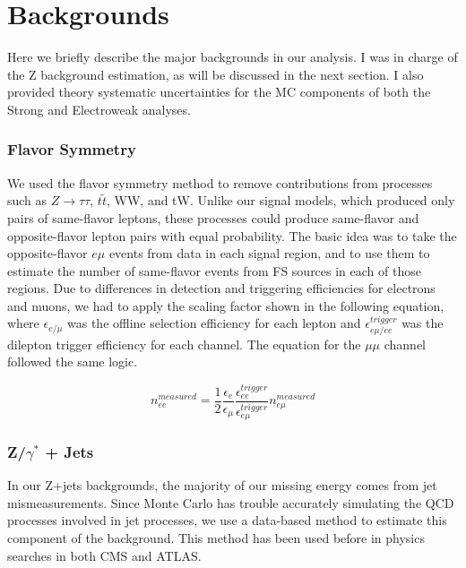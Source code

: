 \chapter{Backgrounds}

Here we briefly describe the major backgrounds in our analysis. I was in charge of the Z background estimation, as will be discussed in the next section. I also provided theory systematic uncertainties for the MC components of both the Strong and Electroweak analyses.

\subsection*{Flavor Symmetry}

We used the flavor symmetry method to remove contributions from processes such as $Z\rightarrow\tau\tau$, $t\tilde{t}$, WW, and tW. Unlike our signal models, which produced only pairs of same-flavor leptons, these processes could produce same-flavor and opposite-flavor lepton pairs with equal probability. The basic idea was to take the opposite-flavor $e\mu$ events from data in each signal region, and to use them to estimate the number of same-flavor events from FS sources in each of those regions. Due to differences in detection and triggering efficiencies for electrons and muons, we had to apply the scaling factor shown in the following equation, where $\epsilon_{e/\mu}$ was the offline selection efficiency for each lepton and $\epsilon_{e\mu/ee}^{trigger}$ was the dilepton trigger efficiency for each channel. The equation for the $\mu\mu$ channel followed the same logic.

\begin{equation}
n_{ee}^{measured} = \frac{1}{2}\frac{\epsilon_e}{\epsilon_{\mu}}\frac{\epsilon_{ee}^{trigger}}{\epsilon_{e\mu}^{trigger}}n_{e\mu}^{measured}
\end{equation}

\subsection*{Z/$\gamma^*$ + Jets}

In our Z+jets backgrounds, the majority of our missing energy comes from jet mismeasurements. Since Monte Carlo has trouble accurately simulating the QCD processes involved in jet processes, we use a data-based method to estimate this component of the background. This method has been used before in physics searches in both CMS and ATLAS.

